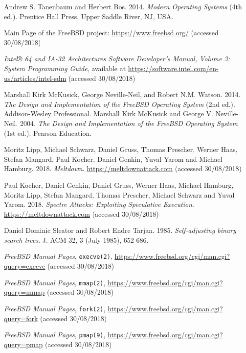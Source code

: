 \documentclass[shortabstract, english]{iithesis}
\begin{document}
\begin{thebibliography}{99}

 Andrew S. Tanenbaum and Herbert Bos. 2014.
  \textit{Modern Operating Systems} (4th ed.). Prentice Hall Press, Upper Saddle
  River, NJ, USA.

 Main Page of the FreeBSD project:
  \url{https://www.freebsd.org/} (accessed 30/08/2018)

 \textit{Intel® 64 and IA-32 Architectures Software
    Developer’s Manual, Volume 3: System Programming Guide}, available at
  \url{https://software.intel.com/en-us/articles/intel-sdm} (accessed
  30/08/2018)

 Marshall Kirk McKusick, George Neville-Neil, and Robert
  N.M. Watson. 2014. \textit{The Design and Implementation of the FreeBSD
    Operating System} (2nd ed.). Addison-Wesley Professional.
 Marshall Kirk McKusick and George V. Neville-Neil.
  2004. \textit{The Design and Implementation of the FreeBSD Operating System}
  (1st ed.). Pearson Education.

 Moritz Lipp, Michael Schwarz, Daniel Gruss, Thomas
  Prescher, Werner Haas, Stefan Mangard, Paul Kocher, Daniel Genkin, Yuval Yarom
  and Michael Hamburg. 2018. \textit{Meltdown}. \url{https://meltdownattack.com}
  (accessed 30/08/2018)

 Paul Kocher, Daniel Genkin, Daniel Gruss, Werner Haas,
  Michael Hamburg, Moritz Lipp, Stefan Mangard, Thomas Prescher, Michael Schwarz
  and Yuval Yarom. 2018. \textit{Spectre Attacks: Exploiting Speculative
    Execution}. \url{https://meltdownattack.com} (accessed 30/08/2018)

 Daniel Dominic Sleator and Robert Endre Tarjan. 1985. \textit{Self-adjusting binary search trees}. J. ACM 32, 3 (July 1985), 652-686.

 \textit{FreeBSD Manual Pages}, \texttt{execve(2)},
  \url{https://www.freebsd.org/cgi/man.cgi?query=execve} (accessed 30/08/2018)

 \textit{FreeBSD Manual Pages}, \texttt{mmap(2)},
  \url{https://www.freebsd.org/cgi/man.cgi?query=mmap} (accessed 30/08/2018)

 \textit{FreeBSD Manual Pages}, \texttt{fork(2)},
  \url{https://www.freebsd.org/cgi/man.cgi?query=fork} (accessed 30/08/2018)

 \textit{FreeBSD Manual Pages}, \texttt{pmap(9)},
  \url{https://www.freebsd.org/cgi/man.cgi?query=pmap} (accessed 30/08/2018)

\end{thebibliography}
\end{document}
